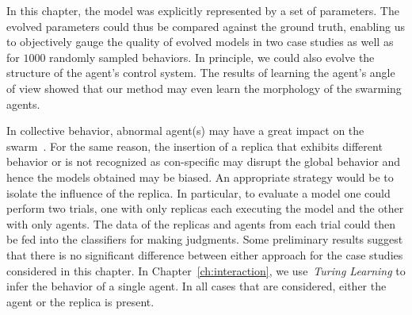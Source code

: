In this chapter, the model was explicitly represented by a set of parameters. The evolved parameters could thus be compared against the ground truth, enabling us to objectively gauge the quality of evolved models in two case studies as well as for $1000$ randomly sampled behaviors. In principle, we could also evolve the structure of the agent's control system. The results of learning the agent's angle of view showed that our method may even learn the morphology of the swarming agents.

In collective behavior, abnormal agent(s) may have a great impact on the swarm~\cite{Bjerknes2013}. For the same reason, the insertion of a replica that exhibits different behavior or is not recognized as con-specific may disrupt the global behavior and hence the models obtained may be biased. An appropriate strategy would be to isolate the influence of the replica. In particular, to evaluate a model one could perform two trials, one with only replicas each executing the model and the other with only agents. The data of the replicas and agents from each trial could then be fed into the classifiers for making judgments. Some preliminary results suggest that there is no significant difference between either approach for the case studies considered in this chapter. In Chapter~\ref{ch:interaction}, we use~\textit{Turing Learning} to infer the behavior of a single agent. In all cases that are considered, either the agent or the replica is present. 



